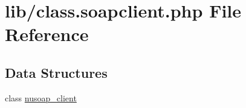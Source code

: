 \hypertarget{class_8soapclient_8php}{}\section{lib/class.soapclient.\+php File Reference}
\label{class_8soapclient_8php}
\subsection*{Data Structures}
\begin{DoxyCompactItemize}
\item 
class \hyperlink{classnusoap__client}{nusoap\+\_\+client}
\end{DoxyCompactItemize}
